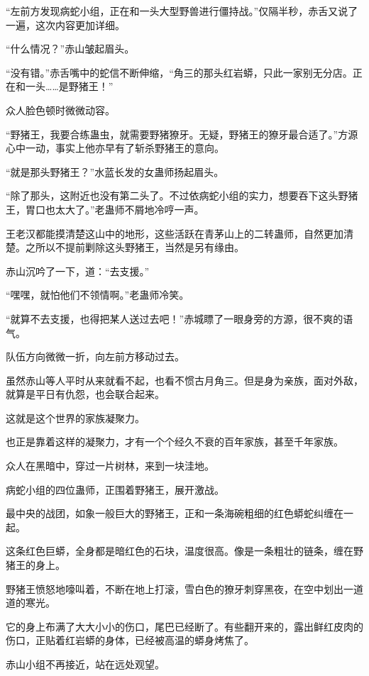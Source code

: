 
\begin{this_body}

“左前方发现病蛇小组，正在和一头大型野兽进行僵持战。”仅隔半秒，赤舌又说了一遍，这次内容更加详细。

“什么情况？”赤山皱起眉头。

“没有错。”赤舌嘴中的蛇信不断伸缩，“角三的那头红岩蟒，只此一家别无分店。正在和一头……是野猪王！”

众人脸色顿时微微动容。

“野猪王，我要合练蛊虫，就需要野猪獠牙。无疑，野猪王的獠牙最合适了。”方源心中一动，事实上他亦早有了斩杀野猪王的意向。

“就是那头野猪王？”水蓝长发的女蛊师扬起眉头。

“除了那头，这附近也没有第二头了。不过依病蛇小组的实力，想要吞下这头野猪王，胃口也太大了。”老蛊师不屑地冷哼一声。

王老汉都能摸清楚这山中的地形，这些活跃在青茅山上的二转蛊师，自然更加清楚。之所以不提前剿除这头野猪王，当然是另有缘由。

赤山沉吟了一下，道：“去支援。”

“嘿嘿，就怕他们不领情啊。”老蛊师冷笑。

“就算不去支援，也得把某人送过去吧！”赤城瞟了一眼身旁的方源，很不爽的语气。

队伍方向微微一折，向左前方移动过去。

虽然赤山等人平时从来就看不起，也看不惯古月角三。但是身为亲族，面对外敌，就算是平日有仇怨，也会联合起来。

这就是这个世界的家族凝聚力。

也正是靠着这样的凝聚力，才有一个个经久不衰的百年家族，甚至千年家族。

众人在黑暗中，穿过一片树林，来到一块洼地。

病蛇小组的四位蛊师，正围着野猪王，展开激战。

最中央的战团，如象一般巨大的野猪王，正和一条海碗粗细的红色蟒蛇纠缠在一起。

这条红色巨蟒，全身都是暗红色的石块，温度很高。像是一条粗壮的链条，缠在野猪王的身上。

野猪王愤怒地嚎叫着，不断在地上打滚，雪白色的獠牙刺穿黑夜，在空中划出一道道的寒光。

它的身上布满了大大小小的伤口，尾巴已经断了。有些翻开来的，露出鲜红皮肉的伤口，正贴着红岩蟒的身体，已经被高温的蟒身烤焦了。

赤山小组不再接近，站在远处观望。


\end{this_body}
